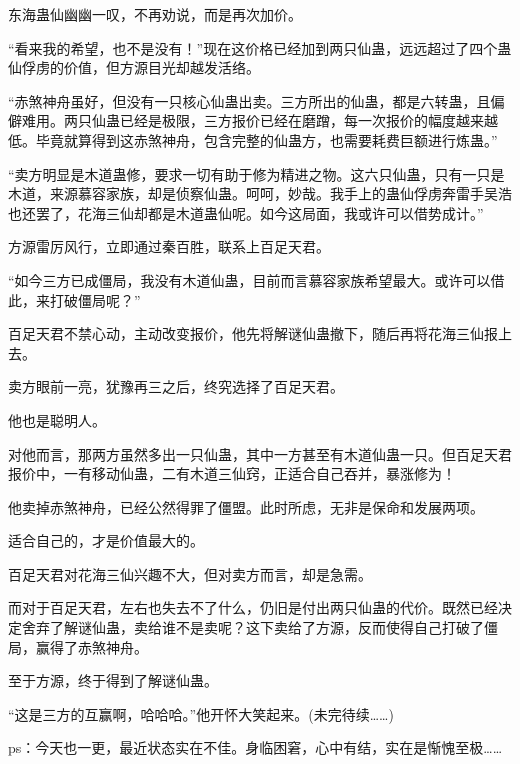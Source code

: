 \begin{this_body}
东海蛊仙幽幽一叹，不再劝说，而是再次加价。

“看来我的希望，也不是没有！”现在这价格已经加到两只仙蛊，远远超过了四个蛊仙俘虏的价值，但方源目光却越发活络。

“赤煞神舟虽好，但没有一只核心仙蛊出卖。三方所出的仙蛊，都是六转蛊，且偏僻难用。两只仙蛊已经是极限，三方报价已经在磨蹭，每一次报价的幅度越来越低。毕竟就算得到这赤煞神舟，包含完整的仙蛊方，也需要耗费巨额进行炼蛊。”

“卖方明显是木道蛊修，要求一切有助于修为精进之物。这六只仙蛊，只有一只是木道，来源慕容家族，却是侦察仙蛊。呵呵，妙哉。我手上的蛊仙俘虏奔雷手吴浩也还罢了，花海三仙却都是木道蛊仙呢。如今这局面，我或许可以借势成计。”

方源雷厉风行，立即通过秦百胜，联系上百足天君。

“如今三方已成僵局，我没有木道仙蛊，目前而言慕容家族希望最大。或许可以借此，来打破僵局呢？”

百足天君不禁心动，主动改变报价，他先将解谜仙蛊撤下，随后再将花海三仙报上去。

卖方眼前一亮，犹豫再三之后，终究选择了百足天君。

他也是聪明人。

对他而言，那两方虽然多出一只仙蛊，其中一方甚至有木道仙蛊一只。但百足天君报价中，一有移动仙蛊，二有木道三仙窍，正适合自己吞并，暴涨修为！

他卖掉赤煞神舟，已经公然得罪了僵盟。此时所虑，无非是保命和发展两项。

适合自己的，才是价值最大的。

百足天君对花海三仙兴趣不大，但对卖方而言，却是急需。

而对于百足天君，左右也失去不了什么，仍旧是付出两只仙蛊的代价。既然已经决定舍弃了解谜仙蛊，卖给谁不是卖呢？这下卖给了方源，反而使得自己打破了僵局，赢得了赤煞神舟。

至于方源，终于得到了解谜仙蛊。

“这是三方的互赢啊，哈哈哈。”他开怀大笑起来。(未完待续……)

ps：今天也一更，最近状态实在不佳。身临困窘，心中有结，实在是惭愧至极……

\end{this_body}

